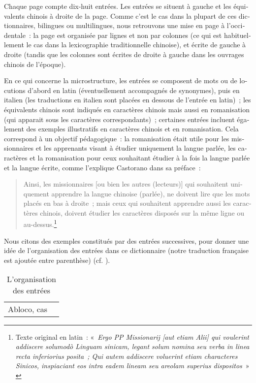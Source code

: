 \documentclass[output=paper,colorlinks,citecolor=brown,arabicfont,chinesefont,booklanguage=french]{langscibook}
\begin{document}
\begin{otherlanguage}{french}
 Chaque page compte dix-huit entrées. Les entrées se situent à gauche et les équivalents chinois à droite de la page. Comme c’est le cas dans la plupart de ces dictionnaires, bilingues ou multilingues, nous retrouvons une mise en page à l’occidentale~: la page est organisée par lignes et non par colonnes (ce qui est habituellement le cas dans la lexicographie traditionnelle chinoise), et écrite de gauche à droite (tandis que les colonnes sont écrites de droite à gauche dans les ouvrages chinois de l’époque).
 
En ce qui concerne la microstructure, les entrées se composent de mots ou de locutions d’abord en latin (éventuellement accompagnés de synonymes), puis en italien (les traductions en italien sont placées en dessous de l’entrée en latin)~; les équivalents chinois sont indiqués en caractères chinois mais aussi en romanisation (qui apparait sous les caractères correspondants)~; certaines entrées incluent également des exemples illustratifs en caractères chinois et en romanisation. Cela correspond à un objectif pédagogique~: la romanisation était utile pour les missionnaires et les apprenants visant à étudier uniquement la langue parlée, les caractères et la romanisation pour ceux souhaitant étudier à la fois la langue parlée et la langue écrite, comme l’explique Castorano dans sa préface~: 

\begin{quote}
    Ainsi, les missionnaires [ou bien les autres (lecteurs)] qui souhaitent uniquement apprendre la langue chinoise (parlée), ne doivent lire que les mots placés en bas à droite~; mais ceux qui souhaitent apprendre aussi les caractères chinois, doivent étudier les caractères disposés sur la même ligne ou au-dessus.\footnote{Texte original en latin~: «~\emph{Ergo PP Missionarij [aut etiam Alii] qui voulerint addiscere solumodò Linguam sinicam, legant solum nomina seu verba in linea recta inferiorius posita~; Qui autem addiscere voluerint etiam characteres Sinicos, inspiaciant eos intra eadem lineam seu areolam superius dispositos}~» \citet[6]{Orazi1732}}
\end{quote}

Nous citons des exemples constitués par des entrées successives, pour donner une idée de l’organisation des entrées dans ce dictionnaire (notre traduction française est ajoutée entre parenthèse) (cf. ).

\begin{table}
\caption{L'organisation des entrées}
\label{tab:gianninoto:1}
\label{tab:gianninoto:frequencies1}
\begin{tabularx}{\linewidth}{QQ}
\lsptoprule
 Abloco, cas
 

\end{tabularx}
\end{table}
\end{otherlanguage}
\end{document}
